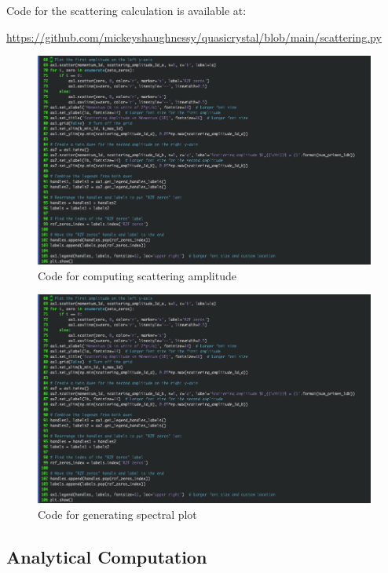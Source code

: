 \documentclass[11pt, oneside]{article}
\begin{document}
Code for the scattering calculation is available at:
 
\url{https://github.com/mickeyshaughnessy/quasicrystal/blob/main/scattering.py}
 
\begin{figure}[htbp]
\begin{center}
    \includegraphics[width=0.8\linewidth]{scattering_code.png}
\caption{Code for computing scattering amplitude}
\label{fig:scattering_code}
\end{center}
\end{figure}
 
\begin{figure}[htbp]
\begin{center}
     \includegraphics[width=0.8\linewidth]{plotting_code.png}

\caption{Code for generating spectral plot}
\label{fig:plotting_code}
\end{center}
\end{figure}

\subsection{Analytical Computation}
\end{document}

